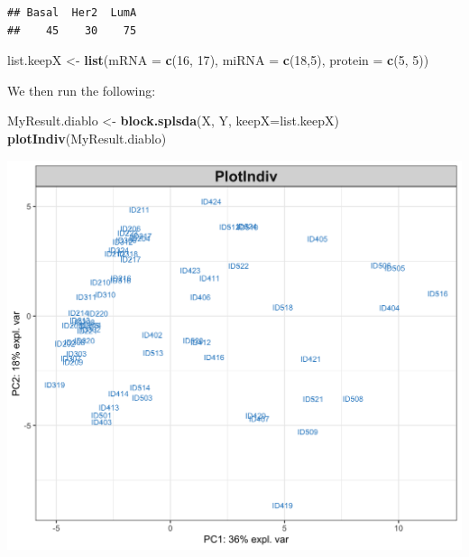 \documentclass[]{book}
\newenvironment{Shaded}{\begin{snugshade}}{\end{snugshade}}
\newcommand{\KeywordTok}[1]{\textcolor[rgb]{0.13,0.29,0.53}{\textbf{#1}}}
\newcommand{\DataTypeTok}[1]{\textcolor[rgb]{0.13,0.29,0.53}{#1}}
\newcommand{\DecValTok}[1]{\textcolor[rgb]{0.00,0.00,0.81}{#1}}
\newcommand{\StringTok}[1]{\textcolor[rgb]{0.31,0.60,0.02}{#1}}
\newcommand{\CommentTok}[1]{\textcolor[rgb]{0.56,0.35,0.01}{\textit{#1}}}
\newcommand{\OperatorTok}[1]{\textcolor[rgb]{0.81,0.36,0.00}{\textbf{#1}}}
\newcommand{\NormalTok}[1]{#1}
\theoremstyle{definition}
\theoremstyle{definition}
\theoremstyle{definition}
\theoremstyle{remark}
\begin{document}
\begin{Shaded}
\end{Shaded}

\begin{verbatim}
## Basal  Her2  LumA 
##    45    30    75
\end{verbatim}

\begin{Shaded}
\begin{Highlighting}[]
\NormalTok{list.keepX <-}\StringTok{ }\KeywordTok{list}\NormalTok{(}\DataTypeTok{mRNA =} \KeywordTok{c}\NormalTok{(}\DecValTok{16}\NormalTok{, }\DecValTok{17}\NormalTok{), }\DataTypeTok{miRNA =} \KeywordTok{c}\NormalTok{(}\DecValTok{18}\NormalTok{,}\DecValTok{5}\NormalTok{), }\DataTypeTok{protein =} \KeywordTok{c}\NormalTok{(}\DecValTok{5}\NormalTok{, }\DecValTok{5}\NormalTok{))}
\end{Highlighting}
\end{Shaded}

We then run the following:

\begin{Shaded}
\begin{Highlighting}[]
\NormalTok{MyResult.diablo <-}\StringTok{ }\KeywordTok{block.splsda}\NormalTok{(X, Y, }\DataTypeTok{keepX=}\NormalTok{list.keepX)}
\KeywordTok{plotIndiv}\NormalTok{(MyResult.diablo)}
\end{Highlighting}
\end{Shaded}

\begin{center}\includegraphics[width=0.5\linewidth]{Figures/unnamed-chunk-2-1} \end{center}
\end{document}
